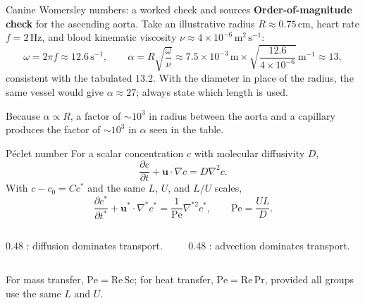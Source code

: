 \documentclass[aspectratio=169,11pt]{beamer}
\newcommand{\uvec}{\bm{u}}
\begin{document}
\begin{frame}{Canine Womersley numbers: a worked check and sources}
\textbf{Order-of-magnitude check} for the ascending aorta. Take an illustrative radius $R\approx0.75\,\mathrm{cm}$, heart rate $f=2\,\mathrm{Hz}$, and blood kinematic viscosity $\nu\approx4\times10^{-6}\,\mathrm{m^2\,s^{-1}}$:
\[
  \omega=2\pi f\approx12.6\,\mathrm{s^{-1}},
  \qquad
  \alpha=R\sqrt{\frac{\omega}{\nu}}
  \approx7.5\times10^{-3}\,\mathrm{m}\times\sqrt{\frac{12.6}{4\times10^{-6}}}\,\mathrm{m^{-1}}
  \approx13,
\]
consistent with the tabulated $13.2$. With the diameter in place of the radius, the same vessel would give $\alpha\approx27$; always state which length is used.

\medskip
\begin{punchbox}
\small Because $\alpha\propto R$, a factor of $\sim10^3$ in radius between the aorta and a capillary produces the factor of $\sim10^3$ in $\alpha$ seen in the table.
\end{punchbox}
\end{frame}

\begin{frame}{Péclet number}
For a scalar concentration $c$ with molecular diffusivity $D$,
\[
  \frac{\partial c}{\partial t}+\uvec\cdot\nabla c=D\nabla^2c.
\]
With $c-c_0=Cc^*$ and the same $L$, $U$, and $L/U$ scales,
\[
  \frac{\partial c^*}{\partial t^*}
  +\uvec^*\cdot\nabla^*c^*
  =\frac{1}{\mathrm{Pe}}\nabla^{*2}c^*,
  \qquad
  \boxed{\mathrm{Pe}=\frac{UL}{D}}.
\]
\begin{columns}[T,onlytextwidth]
\begin{column}{0.48\textwidth}
: diffusion dominates transport.
\end{column}
\begin{column}{0.48\textwidth}
: advection dominates transport.
\end{column}
\end{columns}
\medskip
For mass transfer, $\mathrm{Pe}=\mathrm{Re}\,\mathrm{Sc}$; for heat transfer, $\mathrm{Pe}=\mathrm{Re}\,\mathrm{Pr}$, provided all groups use the same $L$ and $U$.

\end{frame}
\end{document}

